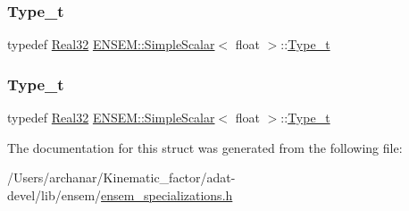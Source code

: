 \mbox{\label{structENSEM_1_1SimpleScalar_3_01float_01_4_a941f810256ed04a2e1880d93b6d09c9b}} 
\subsubsection{\texorpdfstring{Type\_t}{Type\_t}\hspace{0.1cm}{\footnotesize\ttfamily [2/3]}}
{\footnotesize\ttfamily typedef \mbox{\hyperlink{group__defs_gab601f1c55eb75baed0a0859b3fec6bc1}{Real32}} \mbox{\hyperlink{structENSEM_1_1SimpleScalar}{E\+N\+S\+E\+M\+::\+Simple\+Scalar}}$<$ float $>$\+::\mbox{\hyperlink{structENSEM_1_1SimpleScalar_3_01float_01_4_a941f810256ed04a2e1880d93b6d09c9b}{Type\+\_\+t}}}

\mbox{\label{structENSEM_1_1SimpleScalar_3_01float_01_4_a941f810256ed04a2e1880d93b6d09c9b}} 
\subsubsection{\texorpdfstring{Type\_t}{Type\_t}\hspace{0.1cm}{\footnotesize\ttfamily [3/3]}}
{\footnotesize\ttfamily typedef \mbox{\hyperlink{group__defs_gab601f1c55eb75baed0a0859b3fec6bc1}{Real32}} \mbox{\hyperlink{structENSEM_1_1SimpleScalar}{E\+N\+S\+E\+M\+::\+Simple\+Scalar}}$<$ float $>$\+::\mbox{\hyperlink{structENSEM_1_1SimpleScalar_3_01float_01_4_a941f810256ed04a2e1880d93b6d09c9b}{Type\+\_\+t}}}



The documentation for this struct was generated from the following file\+:\begin{DoxyCompactItemize}
\item 
/\+Users/archanar/\+Kinematic\+\_\+factor/adat-\/devel/lib/ensem/\mbox{\hyperlink{adat-devel_2lib_2ensem_2ensem__specializations_8h}{ensem\+\_\+specializations.\+h}}\end{DoxyCompactItemize}
